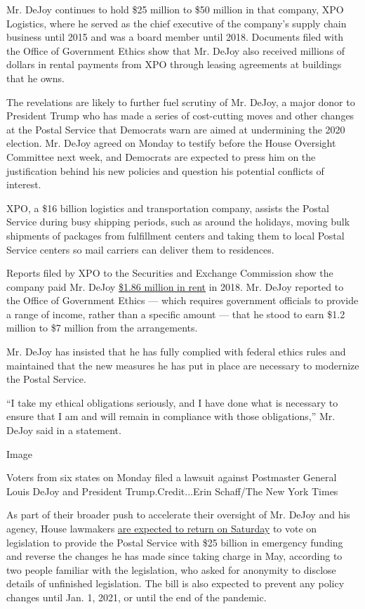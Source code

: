 Mr. DeJoy continues to hold \$25 million to \$50 million in that
company, XPO Logistics, where he served as the chief executive of the
company's supply chain business until 2015 and was a board member until
2018. Documents filed with the Office of Government Ethics show that Mr.
DeJoy also received millions of dollars in rental payments from XPO
through leasing agreements at buildings that he owns.

The revelations are likely to further fuel scrutiny of Mr. DeJoy, a
major donor to President Trump who has made a series of cost-cutting
moves and other changes at the Postal Service that Democrats warn are
aimed at undermining the 2020 election. Mr. DeJoy agreed on Monday to
testify before the House Oversight Committee next week, and Democrats
are expected to press him on the justification behind his new policies
and question his potential conflicts of interest.

XPO, a \$16 billion logistics and transportation company, assists the
Postal Service during busy shipping periods, such as around the
holidays, moving bulk shipments of packages from fulfillment centers and
taking them to local Postal Service centers so mail carriers can deliver
them to residences.

Reports filed by XPO to the Securities and Exchange Commission show the
company paid Mr. DeJoy
\href{https://www.sec.gov/Archives/edgar/data/0001166003/000104746919002443/a2238430zdef14a.htm}{\$1.86
million in rent} in 2018. Mr. DeJoy reported to the Office of Government
Ethics --- which requires government officials to provide a range of
income, rather than a specific amount --- that he stood to earn \$1.2
million to \$7 million from the arrangements.

Mr. DeJoy has insisted that he has fully complied with federal ethics
rules and maintained that the new measures he has put in place are
necessary to modernize the Postal Service.

``I take my ethical obligations seriously, and I have done what is
necessary to ensure that I am and will remain in compliance with those
obligations,'' Mr. DeJoy said in a statement.

Image

Voters from six states on Monday filed a lawsuit against Postmaster
General Louis DeJoy and President Trump.Credit...Erin Schaff/The New
York Times

As part of their broader push to accelerate their oversight of Mr. DeJoy
and his agency, House lawmakers
\href{https://www.nytimes3xbfgragh.onion/2020/08/16/us/politics/coronavirus-postal-service-stimulus-bill.html}{are
expected to return on Saturday} to vote on legislation to provide the
Postal Service with \$25 billion in emergency funding and reverse the
changes he has made since taking charge in May, according to two people
familiar with the legislation, who asked for anonymity to disclose
details of unfinished legislation. The bill is also expected to prevent
any policy changes until Jan. 1, 2021, or until the end of the pandemic.

